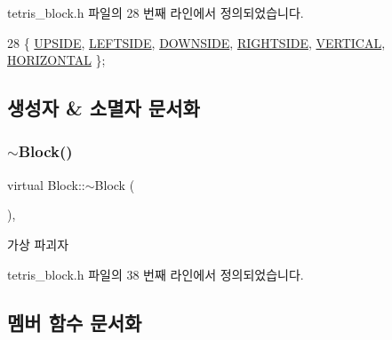 tetris\+\_\+block.\+h 파일의 28 번째 라인에서 정의되었습니다.


\begin{DoxyCode}
28 \{ \mbox{\hyperlink{class_block_a33a96023993478ad4b52426188454765a4529e89ca1c08cc5f81181e355719fad}{UPSIDE}}, \mbox{\hyperlink{class_block_a33a96023993478ad4b52426188454765a9c855bf91465e7da98901d7900740919}{LEFTSIDE}}, \mbox{\hyperlink{class_block_a33a96023993478ad4b52426188454765a73fd4ad0ff8642235ec8549f9290d13b}{DOWNSIDE}}, \mbox{\hyperlink{class_block_a33a96023993478ad4b52426188454765a005424e665ea0b83edfaf9ddb3ab85a1}{RIGHTSIDE}}, \mbox{\hyperlink{class_block_a33a96023993478ad4b52426188454765a76628d7877667ccb2f6e549b89466a4a}{VERTICAL}}, 
      \mbox{\hyperlink{class_block_a33a96023993478ad4b52426188454765a883bda1b4a0cb6d25d8b3c3465f0cfef}{HORIZONTAL}} \}; 
\end{DoxyCode}


\subsection{생성자 \& 소멸자 문서화}
\mbox{\label{class_block_a9f0026f5d2dafca3c101e70e4b34780f}} 
\subsubsection{\texorpdfstring{$\sim$\+Block()}{~Block()}}
{\footnotesize\ttfamily virtual Block\+::$\sim$\+Block (\begin{DoxyParamCaption}{ }\end{DoxyParamCaption})\hspace{0.3cm}{\ttfamily [inline]}, {\ttfamily [virtual]}}



가상 파괴자 



tetris\+\_\+block.\+h 파일의 38 번째 라인에서 정의되었습니다.



\subsection{멤버 함수 문서화}
\mbox{\label{class_block_a2cdc0af223d621add42ac6c37fede329}} 
